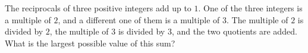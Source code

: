 The reciprocals of three positive integers add up to $1$. One of the three integers is a multiple of $2$, and a different one of them is a multiple of $3$. The multiple of $2$ is divided by $2$, the multiple of $3$ is divided by $3$, and the two quotients are added. What is the largest possible value of this sum?
